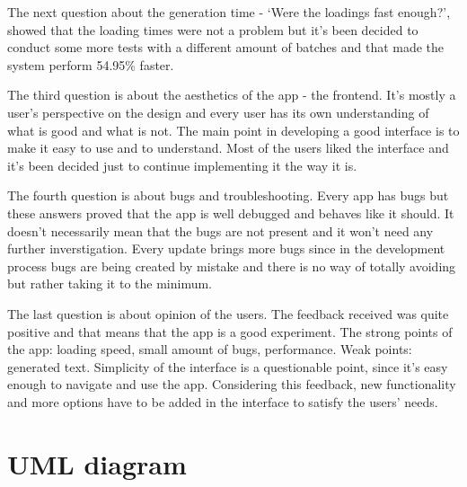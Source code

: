 \documentclass[12pt]{report}
\begin{document}
\begin{appendices}
The next question about the generation time - `Were the loadings fast enough?', showed that the loading times were not a problem
but it's been decided to conduct some more tests with a different amount of batches and that made the system perform 
54.95\% faster.

The third question is about the aesthetics of the app - the frontend. It's mostly a user's perspective on the design and
every user has its own understanding of what is good and what is not. The main point in developing a good interface is to
make it easy to use and to understand. Most of the users liked the interface and it's been decided just to continue implementing
it the way it is.

The fourth question is about bugs and troubleshooting. Every app has bugs but these answers proved that the app is well
debugged and behaves like it should. It doesn't necessarily mean that the bugs are not present and it won't need any further
inverstigation. Every update brings more bugs since in the development process bugs are being created by mistake and there is no way
of totally avoiding but rather taking it to the minimum.

The last question is about opinion of the users. The feedback received was quite positive and that means that the app is a good
experiment. The strong points of the app: loading speed, small amount of bugs, performance. Weak points: generated text.
Simplicity of the interface is a questionable point, since it's easy enough to navigate and use the app. Considering this feedback,
new functionality and more options have to be added in the interface to satisfy the users' needs.

\clearpage

\section*{UML diagram}
\label{appendix:uml}


\end{appendices}
\end{document}
